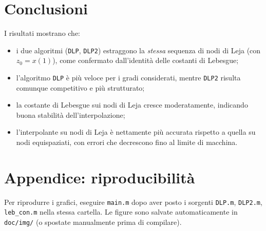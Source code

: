 \documentclass[12pt]{article}
\begin{document}
\section{Conclusioni}
I risultati mostrano che:
\begin{itemize}
  \item i due algoritmi (\texttt{DLP}, \texttt{DLP2}) estraggono la \emph{stessa} sequenza di nodi di Leja (con \(z_0=x(1)\)), come confermato dall'identità delle costanti di Lebesgue;
  \item l'algoritmo \texttt{DLP} è più veloce per i gradi considerati, mentre \texttt{DLP2} risulta comunque competitivo e più strutturato;
  \item la costante di Lebesgue sui nodi di Leja cresce moderatamente, indicando buona stabilità dell'interpolazione;
  \item l'interpolante su nodi di Leja è nettamente più accurata rispetto a quella su nodi equispaziati, con errori che decrescono fino al limite di macchina.
\end{itemize}

\section*{Appendice: riproducibilità}
Per riprodurre i grafici, eseguire \texttt{main.m} dopo aver posto i sorgenti \texttt{DLP.m}, \texttt{DLP2.m}, \texttt{leb\_con.m} nella stessa cartella. Le figure sono salvate automaticamente in \texttt{doc/img/} (o spostate manualmente prima di compilare).
\end{document}
